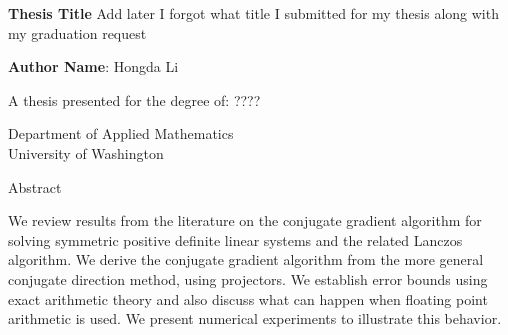 \documentclass[]{article}
\theoremstyle{definition}
\begin{document}



\begin{center}
    \vspace*{1cm}
    \textbf{Thesis Title}
        Add later I forgot what title I submitted for my thesis along with my graduation request
    \vspace{1.5cm}

    \textbf{Author Name}: Hongda Li

    \vfill
         
    A thesis presented for the degree of: ???? 
         
    \vspace{0.8cm}
         
    Department of Applied Mathematics\\

    University of Washington\\

    

\end{center}

    \begin{center}
        Abstract
    \end{center}

We review results from the literature on the conjugate gradient algorithm for solving symmetric positive definite linear systems and the related Lanczos algorithm.  We derive the conjugate gradient algorithm from the more general conjugate direction method, using projectors.  We establish error bounds using exact arithmetic theory and also discuss what can happen when floating point arithmetic is used.  We present numerical experiments to illustrate this behavior.         
\end{document}
